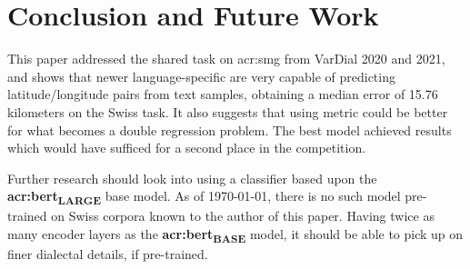 \section{Conclusion and Future Work}
\label{sec:Conclusion}

\begin{comment}
What are the main contributions? How significant are they?
Discuss the contributions in terms of the initial goal formulated in the Introduction.

Also consider how you think the work could be extended or improved, or what you could have done differently.
\end{comment}

This paper addressed the shared task on \acrlong{acr:smg} from VarDial 2020 and 2021, and shows that newer language-specific  are very capable of predicting latitude/longitude pairs from text samples, obtaining a median error of 15.76 kilometers on the Swiss task. It also suggests that using metric  could be better for what becomes a double regression problem. The best model achieved results which would have sufficed for a second place in the \citeyear{gamanReportVarDialEvaluation2020} competition.

Further research should look into using a classifier based upon the \textbf{\acrshort{acr:bert}\textsubscript{LARGE}} base model. As of \today, there is no such model pre-trained on Swiss corpora known to the author of this paper. Having twice as many encoder layers as the \textbf{\acrshort{acr:bert}\textsubscript{BASE}} model, it should be able to pick up on finer dialectal details, if pre-trained.
